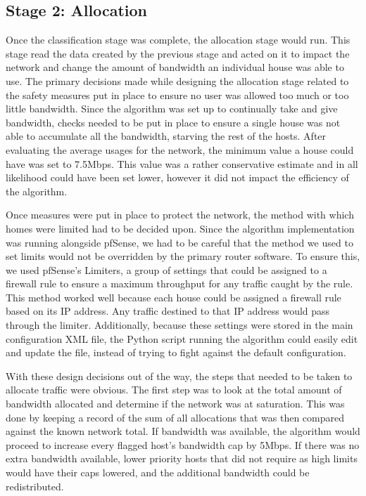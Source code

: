 \subsection{Stage 2: Allocation}
Once the classification stage was complete, the allocation stage would run.
This stage read the data created by the previous stage and acted on it to impact the network and change the amount of bandwidth an individual house was able to use.
The primary decisions made while designing the allocation stage related to the safety measures put in place to ensure no user was allowed too much or too little bandwidth.
Since the algorithm was set up to continually take and give bandwidth, checks needed to be put in place to ensure a single house was not able to accumulate all the bandwidth, starving the rest of the hosts.
After evaluating the average usages for the network, the minimum value a house could have was set to 7.5Mbps.
This value was a rather conservative estimate and in all likelihood could have been set lower, however it did not impact the efficiency of the algorithm.\par
Once measures were put in place to protect the network, the method with which homes were limited had to be decided upon.
Since the algorithm implementation was running alongside pfSense, we had to be careful that the method we used to set limits would not be overridden by the primary router software.
To ensure this, we used pfSense's Limiters, a group of settings that could be assigned to a firewall rule to ensure a maximum throughput for any traffic caught by the rule.
This method worked well because each house could be assigned a firewall rule based on its IP address.
Any traffic destined to that IP address would pass through the limiter.
Additionally, because these settings were stored in the main configuration XML file, the Python script running the algorithm could easily edit and update the file, instead of trying to fight against the default configuration.\par
With these design decisions out of the way, the steps that needed to be taken to allocate traffic were obvious.
The first step was to look at the total amount of bandwidth allocated and determine if the network was at saturation.
This was done by keeping a record of the sum of all allocations that was then compared against the known network total.
If bandwidth was available, the algorithm would proceed to increase every flagged host's bandwidth cap by 5Mbps.
If there was no extra bandwidth available, lower priority hosts that did not require as high limits would have their caps lowered, and the additional bandwidth could be redistributed.
